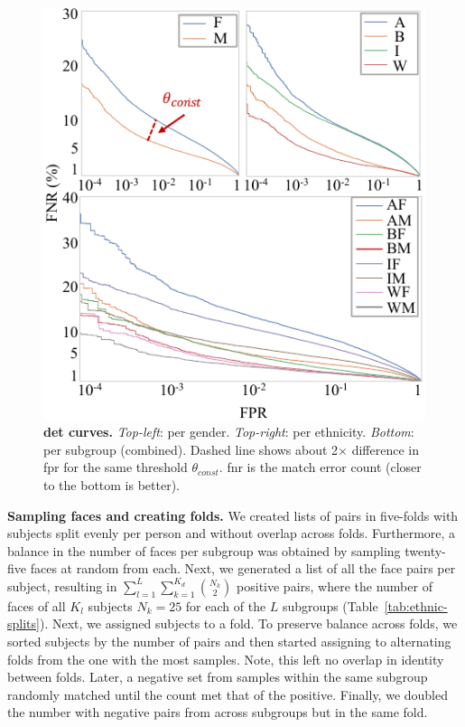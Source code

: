 \begin{figure}[!t] 
	\centering    
	\includegraphics[width=.83\linewidth]{figures/detcurve-improved.pdf}
		\caption{\small{\textbf{\gls{det} curves.} \emph{Top-left}: per gender. \emph{Top-right}: per ethnicity. \emph{Bottom}: per subgroup (\ie combined). Dashed line shows about 2$\times$ difference in \gls{fpr} for the same threshold $\theta_{const}$. \gls{fnr} is the match error count (closer to the bottom is better).}}
\label{fig:detcurves} 
 \vspace{-4mm}
\end{figure} 
\noindent\textbf{Sampling faces and creating folds.} We created lists of pairs in five-folds with subjects split evenly per person and without overlap across folds. Furthermore, a balance in the number of faces per subgroup was obtained by sampling twenty-five faces at random from each. Next, we generated a list of all the face pairs per subject, resulting in $\sum_{l=1}^{L}\sum_{k=1}^{K_d} {N_k \choose 2}$ positive pairs, where the number of faces of all $K_l$ subjects $N_k=25$  for each of the $L$ subgroups (Table~\ref{tab:ethnic-splits}). Next, we assigned subjects to a fold. To preserve balance across folds, we sorted subjects by the number of pairs and then started assigning to alternating folds from the one with the most samples. Note, this left no overlap in identity between folds. Later, a negative set from samples within the same subgroup randomly matched until the count met that of the positive. Finally, we doubled the number with negative pairs from across subgroups but in the same fold.

